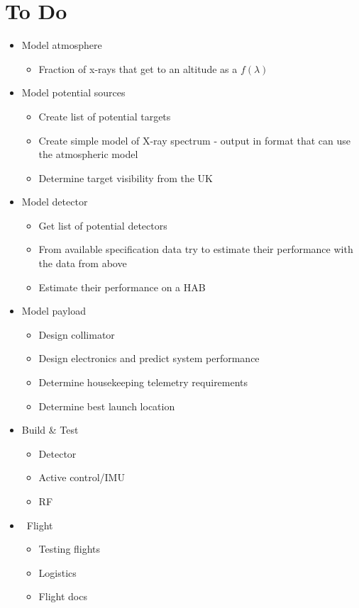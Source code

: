 \documentclass[10pt,a4paper]{article}
\begin{document}
\section*{To Do}

\begin{itemize}

\item Model atmosphere
\begin{itemize}
\item Fraction of x-rays that get to an altitude as a $f\left( \lambda \right)$
\end{itemize}

\item Model potential sources
\begin{itemize}
\item Create list of potential targets
\item Create simple model of X-ray spectrum - output in format that can use the atmospheric model
\item Determine target visibility from the UK
\end{itemize}

\item Model detector
\begin{itemize}
\item Get list of potential detectors
\item From available specification data try to estimate their performance with the data from above
\item Estimate their performance on a HAB
\end{itemize}

\item Model payload
\begin{itemize}
\item Design collimator
\item Design electronics and predict system performance 
\item Determine housekeeping telemetry requirements
\item Determine best launch location
\end{itemize}

\item Build \& Test
\begin{itemize}
\item Detector
\item Active control/IMU
\item RF
\end{itemize}


\item \ Flight
\begin{itemize}
\item Testing flights
\item Logistics
\item Flight docs
\end{itemize}
\end{itemize}
\end{document}
